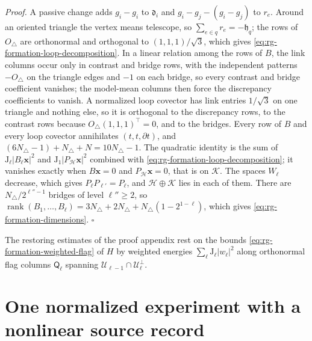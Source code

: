 \noindent\emph{Proof.}
A passive change adds \(g_i-g_i\) to \(\mathfrak d_i\) and
\(g_i-g_j-(g_i-g_j)\) to \(r_e\). Around an oriented triangle the vertex means
telescope, so \(\sum_{e\in q}r_e=-\mathfrak h_q\); the rows of \(O_\triangle\)
are orthonormal and orthogonal to \((1,1,1)/\sqrt3\), which gives
\cref{eq:rg-formation-loop-decomposition}. In a linear relation among the rows
of \(B\), the link columns occur only in contrast and bridge rows, with the
independent patterns \(-O_\triangle\) on the triangle edges and \(-1\) on each
bridge, so every contrast and bridge coefficient vanishes; the model-mean
columns then force the discrepancy coefficients to vanish. A normalized loop
covector has link entries \(1/\sqrt3\) on one triangle and nothing else, so it
is orthogonal to the discrepancy rows, to the contrast rows because
\(O_\triangle(1,1,1)^\top=0\), and to the bridges. Every row of \(B\) and every
loop covector annihilates \((t,t,\partial t)\), and
\((6N_\triangle-1)+N_\triangle+N=10N_\triangle-1\). The quadratic identity is
the sum of \(\mathrm J_\ell|B_\ell\mathbf x|^2\) and
\(\mathrm J_1|P_{\mathcal H}\mathbf x|^2\) combined with
\cref{eq:rg-formation-loop-decomposition}; it vanishes exactly when
\(B\mathbf x=0\) and \(P_{\mathcal H}\mathbf x=0\), that is on \(\mathcal K\).
The spaces \(W_\ell\) decrease, which gives \(P_\ell P_{\ell'}=P_\ell\), and
\(\mathcal H\oplus\mathcal K\) lies in each of them. There are
\(N_\triangle/2^{\ell''-1}\) bridges of level \(\ell''\ge2\), so
\(\operatorname{rank}(B_1,\ldots,B_\ell)=3N_\triangle+2N_\triangle
+N_\triangle(1-2^{1-\ell})\), which gives
\cref{eq:rg-formation-dimensions}. \(\square\)

The restoring estimates of the proof appendix rest on the bounds
\cref{eq:rg-formation-weighted-flag} of \(H\) by weighted energies
\(\sum_\ell\mathrm J_\ell|w_\ell|^2\) along orthonormal flag columns
\(\mathsf Q_\ell\) spanning \(\mathcal U_{\ell-1}\cap\mathcal U_\ell^\perp\).

\section{One normalized experiment with a nonlinear source record}
\label{sec:rg-formation-normalized-model}

